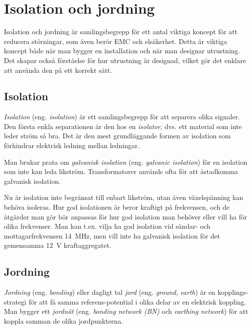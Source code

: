 \chapter{Isolation och jordning}

Isolation och jordning är samlingsbegrepp för ett antal viktiga koncept för
att reducera störningar, som även berör EMC och elsäkerhet. Detta är viktiga
koncept både när man bygger en installation och när man designar utrustning.
Det skapar också förståelse för hur utrustning är designad, vilket gör det
enklare att använda den på ett korrekt sätt.

\section{Isolation}

\emph{Isolation} (eng. \emph{isolation}) är ett samlingsbegrepp för att separera
olika signaler. Den första enkla separationen är den hos en \emph{isolator},
dvs. ett material som inte leder ström så bra. Det är den mest grundläggande
formen av isolation som förhindrar elektrisk ledning mellan ledningar.

Man brukar prata om \emph{galvanisk isolation} (eng. \emph{galvanic isolation})
för en isolation som inte kan leda likström. Transformatorer används ofta för
att åstadkomma galvanisk isolation.

Nu är isolation inte begränsat till enbart likström, utan även växelspänning
kan behöva isoleras. Hur god isolationen är beror kraftigt på frekvensen, och
de åtgärder man gör bör anpassas för hur god isolation man behöver eller vill
ha för olika frekvenser. Man kan t.ex. vilja ha god isolation vid sändar- och mottagarfrekvensen 14~MHz, men vill inte ha galvanisk isolation för det gemensamma 12~V kraftaggregatet.

\section{Jordning}

\emph{Jordning} (eng. \emph{bonding}) eller dagligt tal \emph{jord} (eng.
\emph{ground}, \emph{earth}) är en kopplings-strategi för att få samma
referens-potential i olika delar av en elektrisk koppling. Man bygger ett
\emph{jordnät} (eng. \emph{bonding network (BN)} \cite[3.2.1]{K27-1991} och
\emph{earthing network}) \cite[3.1.3]{K27-1991} för att koppla samman de olika
jordpunkterna.

